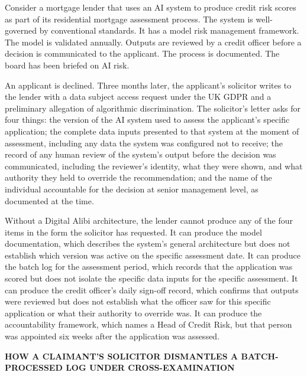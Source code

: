 Consider a mortgage lender that uses an AI system to produce credit risk scores as part of its residential mortgage assessment process. The system is well-governed by conventional standards. It has a model risk management framework. The model is validated annually. Outputs are reviewed by a credit officer before a decision is communicated to the applicant. The process is documented. The board has been briefed on AI risk.

An applicant is declined. Three months later, the applicant's solicitor writes to the lender with a data subject access request under the UK GDPR and a preliminary allegation of algorithmic discrimination. The solicitor's letter asks for four things: the version of the AI system used to assess the applicant's specific application; the complete data inputs presented to that system at the moment of assessment, including any data the system was configured not to receive; the record of any human review of the system's output before the decision was communicated, including the reviewer's identity, what they were shown, and what authority they held to override the recommendation; and the name of the individual accountable for the decision at senior management level, as documented at the time.

Without a Digital Alibi architecture, the lender cannot produce any of the four items in the form the solicitor has requested. It can produce the model documentation, which describes the system's general architecture but does not establish which version was active on the specific assessment date. It can produce the batch log for the assessment period, which records that the application was scored but does not isolate the specific data inputs for the specific assessment. It can produce the credit officer's daily sign-off record, which confirms that outputs were reviewed but does not establish what the officer saw for this specific application or what their authority to override was. It can produce the accountability framework, which names a Head of Credit Risk, but that person was appointed six weeks after the application was assessed.

\textbf{HOW A CLAIMANT'S SOLICITOR DISMANTLES A BATCH-PROCESSED LOG UNDER CROSS-EXAMINATION}


